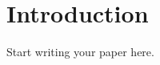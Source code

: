 \documentclass{article}
\begin{document}
\section{Introduction}

Start writing your paper here.
\end{document}
